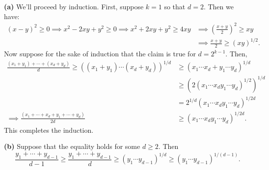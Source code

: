 \documentclass[11pt,letterpaper]{article}
\begin{document}
\begin{solution}
    \textbf{(a)} We'll proceed by induction. First, suppose $k=1$ so that $d=2$. Then we have:
    \[
        \begin{aligned}
            (x-y)^2\geq 0\implies x^2-2xy+y^2\geq 0 \implies x^2+2xy+y^2\geq 4xy &\implies \left(\frac{x+y}{2}\right)^2 \geq xy\\
            &\implies \frac{x+y}{2}\geq (xy)^{1 /2}.
        \end{aligned}
    \]
    Now suppose for the sake of induction that the claim is true for $d=2^{k-1}$. Then,
    \[
        \begin{aligned}
            \frac{(x_1+y_1)+\cdots+(x_d+y_d)}{d}\geq ((x_1+y_1)\cdots(x_d+y_d))^{1 /d}&\geq (x_1\cdots x_d + y_1\cdots y_d)^{1 /d}\\
            &\geq \left(2(x_1\cdots x_dy_1\cdots y_d)^{1 /2}\right)^{1 /d}\\
            &= 2^{1 /d}\left(x_1\cdots x_dy_1\cdots y_d\right)^{1 /2d}\\
            \implies \frac{(x_1+\cdots+x_d+y_1+\cdots +y_d)}{2d}&\geq (x_1\cdots x_dy_1\cdots y_d)^{1 /2d}.
        \end{aligned}
    \]
    This completes the induction.

    \textbf{(b)} Suppose that the equality holds for some $d\geq 2$. Then
    \[
        \frac{y_1+\cdots+y_{d-1}}{d-1}\geq \frac{y_1+\cdots+y_{d-1}}{d}\geq (y_1\cdots y_{d-1})^{1 /d} \geq (y_1\cdots y_{d-1})^{1 /(d-1)}
    .\] 
\end{solution}
\end{document}
